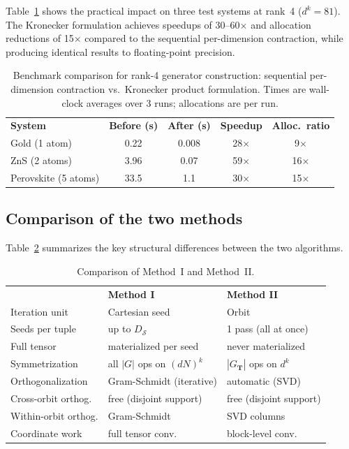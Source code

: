 \documentclass[twocolumn,amsmath,amssymb,aps,prb,10pt,floatfix]{revtex4-2}
\newcommand{\vT}{\mathbf{T}}
\begin{document}
Table~\ref{tab:kronecker_benchmark} shows the practical impact on three test systems at rank~4 ($d^k = 81$).
The Kronecker formulation achieves speedups of 30--60$\times$ and allocation reductions of 15$\times$ compared to the sequential per-dimension contraction, while producing identical results to floating-point precision.

\begin{table}[ht]
\caption{Benchmark comparison for rank-4 generator construction: sequential per-dimension contraction vs.\ Kronecker product formulation.
Times are wall-clock averages over 3 runs; allocations are per run.}
\label{tab:kronecker_benchmark}
\begin{ruledtabular}
\begin{tabular}{lcccc}
\textbf{System} & \textbf{Before (s)} & \textbf{After (s)} & \textbf{Speedup} & \textbf{Alloc.\ ratio} \\
\colrule
Gold (1 atom)       & 0.22  & 0.008 & 28$\times$ & 9$\times$ \\
ZnS (2 atoms)       & 3.96  & 0.07  & 59$\times$ & 16$\times$ \\
Perovskite (5 atoms) & 33.5  & 1.1   & 30$\times$ & 15$\times$ \\
\end{tabular}
\end{ruledtabular}
\end{table}


\subsection{Comparison of the two methods}
\label{sec:method_comparison}

Table~\ref{tab:comparison} summarizes the key structural differences between the two algorithms.

\begin{table}[ht]
\caption{Comparison of Method~I and Method~II.}
\label{tab:comparison}
\begin{ruledtabular}
\begin{tabular}{lll}
& \textbf{Method I} & \textbf{Method II} \\
\colrule
Iteration unit & Cartesian seed & Orbit \\
Seeds per tuple & up to $D_{\mathcal{S}}$ & 1 pass (all at once) \\
Full tensor & materialized per seed & never materialized \\
Symmetrization & all $|G|$ ops on $(dN)^k$ & $|G_{\vT}|$ ops on $d^k$ \\
Orthogonalization & Gram-Schmidt (iterative) & automatic (SVD) \\
Cross-orbit orthog. & free (disjoint support) & free (disjoint support) \\
Within-orbit orthog. & Gram-Schmidt & SVD columns \\
Coordinate work & full tensor conv. & block-level conv. \\
\end{tabular}
\end{ruledtabular}
\end{table}
\end{document}
